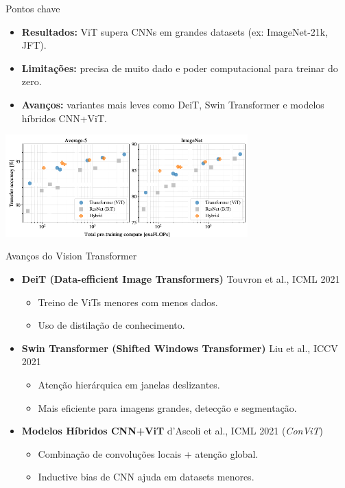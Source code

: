 \documentclass{beamer}
\begin{document}
\begin{frame}{Pontos chave}
	\begin{itemize}
		\item \textbf{Resultados:} ViT supera CNNs em grandes datasets (ex: ImageNet-21k, JFT).
		\item \textbf{Limitações:} precisa de muito dado e poder computacional para treinar do zero.
		\item \textbf{Avanços:} variantes mais leves como DeiT, Swin Transformer e modelos híbridos CNN+ViT.
	\end{itemize}
\vspace{0.3cm}
	\begin{center}
		\includegraphics[width=0.7\textwidth]{assets/vit_hybrids.png} 
	\end{center}
\end{frame}

\begin{frame}{Avanços do Vision Transformer}
\begin{itemize}
    \item \textbf{DeiT (Data-efficient Image Transformers)}  
    Touvron et al., ICML 2021  
    \begin{itemize}
        \item Treino de ViTs menores com menos dados.
        \item Uso de distilação de conhecimento.
    \end{itemize}

    \vspace{0.2cm}

    \item \textbf{Swin Transformer (Shifted Windows Transformer)}  
    Liu et al., ICCV 2021  
    \begin{itemize}
        \item Atenção hierárquica em janelas deslizantes.
        \item Mais eficiente para imagens grandes, detecção e segmentação.
    \end{itemize}

    \vspace{0.2cm}

    \item \textbf{Modelos Híbridos CNN+ViT}  
    d’Ascoli et al., ICML 2021 (\textit{ConViT})  
    \begin{itemize}
        \item Combinação de convoluções locais + atenção global.
        \item Inductive bias de CNN ajuda em datasets menores.
    \end{itemize}
\end{itemize}
\end{frame}
\end{document}
